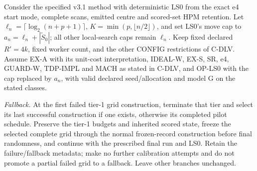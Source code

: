 \begin{proposition}\label{reg:C-DLV_Prop-F}
Consider the specified v3.1 method with deterministic LS0 from the exact e4 start mode, complete scans, emitted centre and scored-set HPM retention. Let $\ell_n=\lceil\log_2(n+p+1)\rceil$, $K=\min(p,\lfloor n/2\rfloor)$, and set LS0's move cap to $a_n=\ell_n+|\tilde{S}_0|$; all other local-search caps remain $\ell_n$. Keep fixed declared $R'=4k$, fixed worker count, and the other CONFIG restrictions of C-DLV. Assume EX-A with its unit-cost interpretation, IDEAL-W, EX-S, SR, e4, GUARD-W, TDP-IMPL and MACH as stated in C-DLV, and OP-LS0 with the cap replaced by $a_n$, with valid declared seed/allocation and model G on the stated classes.

\emph{Fallback.} At the first failed tier-1 grid construction, terminate that tier and select its last successful construction if one exists, otherwise its completed pilot schedule. Preserve the tier-1 budgets and inherited scored state, freeze the selected complete grid through the normal frozen-record construction before final randomness, and continue with the prescribed final run and LS0. Retain the failure/fallback metadata; make no further calibration attempts and do not promote a partial failed grid to a fallback. Leave other branches unchanged.


\end{proposition}
